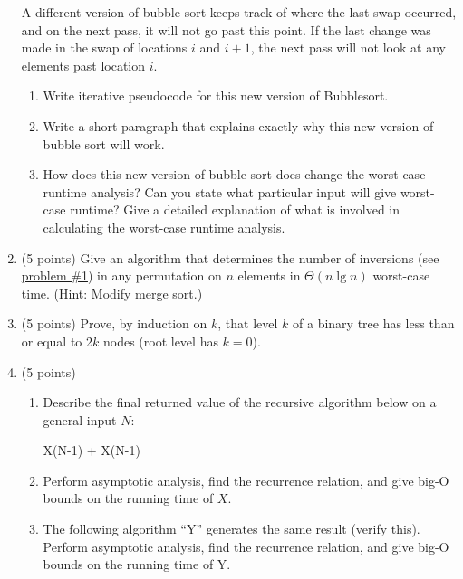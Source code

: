 \documentclass[12pt]{report}
\begin{document}
\begin{enumerate}[label=\arabic*.]
	A different version of bubble sort keeps track of where the last swap occurred, and on the next pass, it will not go past this point. If the last change was made in the swap of locations $i$ and $i+1$, the next pass will not look at any elements past location $i$.
	\begin{enumerate}[label=\arabic{enumi}\alph*)]
	    \item Write iterative pseudocode for this new version of Bubblesort.
		\item Write a short paragraph that explains exactly why this new version of bubble sort will work.
		\item How does this new version of bubble sort does change the worst-case runtime analysis? Can you state what particular input will give worst-case runtime?  Give a detailed explanation of what is involved in calculating the worst-case runtime analysis.
	\end{enumerate}
	\item (5 points) Give an algorithm that determines the number of inversions (see \hyperref[prb:1]{problem \#1}) in any permutation on $n$ elements in $\Theta(n \lg n)$ worst-case time. (Hint: Modify merge sort.)
	\item (5 points) Prove, by induction on $k$, that level $k$ of a binary tree has less than or equal to 2$k$ nodes (root level has $k=0$).
	\item (5 points)
	\begin{enumerate}[label=\arabic{enumi}\alph*)]
	    \item Describe the final returned value of the recursive algorithm below on a general input $N$:
		\begin{algorithm}[H]
			\label{alg:6a}
			\begin{algorithmic}[1]
					\State {}
				\Else
					\State \Return X(N-1) + X(N-1)
				\EndIf
			\EndFunction
			\end{algorithmic}
		\end{algorithm}
		\item Perform asymptotic analysis, find the recurrence relation, and give big-O bounds on the running time of $X$.
		\item The following algorithm ``Y'' generates the same result (verify this). Perform asymptotic analysis, find the recurrence relation, and give big-O bounds on the running time of Y.
		\begin{algorithm}[H]
			\label{alg:6c}
			\begin{algorithmic}[1]

\end{algorithmic}
\end{algorithm}
\end{enumerate}
\end{enumerate}
\end{document}
